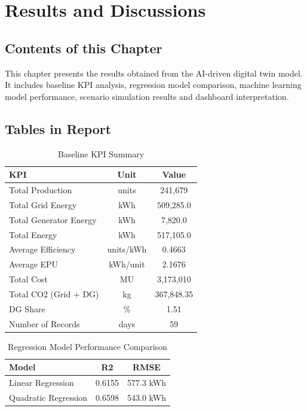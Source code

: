 \chapter{Results and Discussions}
\label{chap:results}

\section{Contents of this Chapter}
This chapter presents the results obtained from the AI-driven digital twin model. It includes baseline KPI analysis, regression model comparison, machine learning model performance, scenario simulation results and dashboard interpretation.

\section{Tables in Report}

\begin{table}[htbp]
\centering
\caption{Baseline KPI Summary}
\label{tab:baseline_kpi}
\begin{tabular}{|l|c|c|}
\hline
\textbf{KPI} & \textbf{Unit} & \textbf{Value} \\
\hline
Total Production & units & 241,679 \\
Total Grid Energy & kWh & 509,285.0 \\
Total Generator Energy & kWh & 7,820.0 \\
Total Energy & kWh & 517,105.0 \\
Average Efficiency & units/kWh & 0.4663 \\
Average EPU & kWh/unit & 2.1676 \\
Total Cost & MU & 3,173,010 \\
Total CO2 (Grid + DG) & kg & 367,848.35 \\
DG Share & \% & 1.51 \\
Number of Records & days & 59 \\
\hline
\end{tabular}
\end{table}

\begin{table}[htbp]
\centering
\caption{Regression Model Performance Comparison}
\label{tab:regression_perf}
\begin{tabular}{|l|c|c|}
\hline
\textbf{Model} & \textbf{R2} & \textbf{RMSE} \\
\hline
Linear Regression & 0.6155 & 577.3 kWh \\
Quadratic Regression & 0.6598 & 543.0 kWh \\
\hline
\end{tabular}
\end{table}

